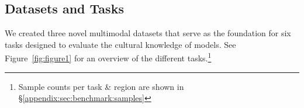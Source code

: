 \subsection{Datasets and Tasks}
\label{sec:benchmark:datasets}
%
We created three novel multimodal datasets that serve as the foundation for six tasks designed to evaluate the cultural knowledge of models.
%
See Figure~\ref{fig:figure1} for an overview of the different tasks.\footnote{Sample counts per task \& region are shown in \S\ref{appendix:sec:benchmark:samples}}
%

%
%

%

%

%

%
